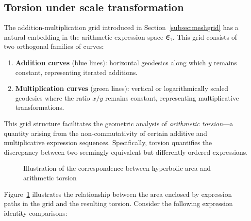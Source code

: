 \subsection{Torsion under scale transformation}\label{subsec:gridsandtorsion}

The addition-multiplication grid introduced in Section~\ref{subsec:meshgrid} has a natural embedding in the arithmetic expression space $\mathfrak{E}_1$. This grid consists of two orthogonal families of curves:

\begin{enumerate}
\item \textbf{Addition curves} (blue lines): horizontal geodesics along which $y$ remains constant, representing iterated additions.
\item \textbf{Multiplication curves} (green lines): vertical or logarithmically scaled geodesics where the ratio $x/y$ remains constant, representing multiplicative transformations.
\end{enumerate}

This grid structure facilitates the geometric analysis of \emph{arithmetic torsion}—a quantity arising from the non-commutativity of certain additive and multiplicative expression sequences. Specifically, torsion quantifies the discrepancy between two seemingly equivalent but differently ordered expressions.

\begin{figure}[ht]
\centering
{}
\caption{Illustration of the correspondence between hyperbolic area and arithmetic torsion}\label{fig:area-formula}
\end{figure}

Figure~\ref{fig:area-formula} illustrates the relationship between the area enclosed by expression paths in the grid and the resulting torsion. Consider the following expression identity comparisons:

